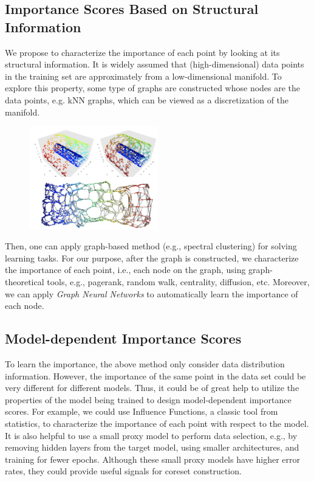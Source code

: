 \documentclass[12pt]{article}
\begin{document}
\subsection{Importance Scores Based on Structural Information} 
We propose to characterize the importance of each point by looking at its structural information. It is widely assumed that (high-dimensional) data points in the training set are approximately from a low-dimensional manifold. To explore this property, some type of graphs are constructed whose nodes are the data points, e.g. kNN graphs, which can be viewed as a discretization of the manifold. 
\begin{figure}[h]
	\centering
	\includegraphics[width=0.5\textwidth]{manifold}
\end{figure}

Then, one can apply graph-based method (e.g., spectral clustering) for solving learning tasks. For our purpose, after the graph is constructed, we characterize the importance of each point, i.e., each node on the graph, using graph-theoretical tools, e.g., pagerank, random walk, centrality, diffusion, etc. Moreover, we can apply \emph{Graph Neural Networks} to automatically learn the importance of each node. 

\subsection{Model-dependent Importance Scores}
To learn the importance, the above method only consider data distribution information. However, the importance of the same point in the data set could be very different for different models. Thus, it could be of great help to utilize the properties of the model being trained to design model-dependent importance scores. For example, we could use Influence Functions, a classic tool from statistics, to characterize the importance of each point with respect to the model. It is also helpful to use a small proxy model to perform data selection, e.g., by removing hidden layers from the target model, using smaller architectures, and training for fewer epochs. Although these small proxy models have higher error rates, they could provide useful signals for coreset construction.
\end{document}
